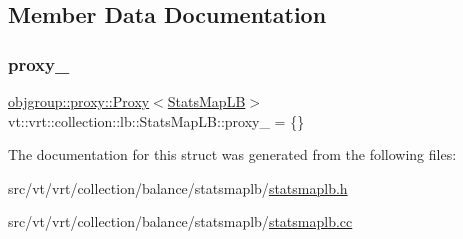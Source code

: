 \subsection{Member Data Documentation}
\mbox{\label{structvt_1_1vrt_1_1collection_1_1lb_1_1_stats_map_l_b_a184d157fdde8798ec9ed79a2f4238816}} 
\subsubsection{\texorpdfstring{proxy\+\_\+}{proxy\_}}
{\footnotesize\ttfamily \hyperlink{structvt_1_1objgroup_1_1proxy_1_1_proxy}{objgroup\+::proxy\+::\+Proxy}$<$\hyperlink{structvt_1_1vrt_1_1collection_1_1lb_1_1_stats_map_l_b}{Stats\+Map\+LB}$>$ vt\+::vrt\+::collection\+::lb\+::\+Stats\+Map\+L\+B\+::proxy\+\_\+ = \{\}\hspace{0.3cm}{\ttfamily [private]}}



The documentation for this struct was generated from the following files\+:\begin{DoxyCompactItemize}
\item 
src/vt/vrt/collection/balance/statsmaplb/\hyperlink{statsmaplb_8h}{statsmaplb.\+h}\item 
src/vt/vrt/collection/balance/statsmaplb/\hyperlink{statsmaplb_8cc}{statsmaplb.\+cc}\end{DoxyCompactItemize}
